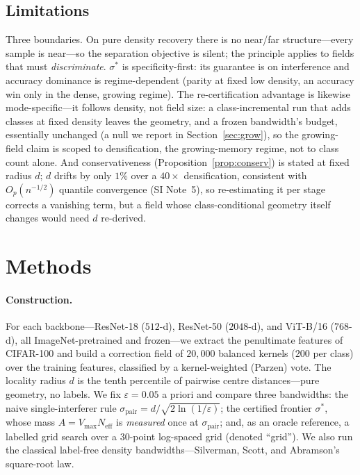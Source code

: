 \documentclass[10pt,twocolumn]{article}
\newcommand{\sstar}{\sigma^{*}}
\newcommand{\Neff}{N_{\mathrm{eff}}}
\begin{document}
\subsection{Limitations}\label{sec:limits}
Three boundaries. On pure density recovery there is no near/far structure---every sample is near---so the separation objective is silent; the principle applies to fields that must \emph{discriminate}. $\sstar$ is specificity-first: its guarantee is on interference and accuracy dominance is regime-dependent (parity at fixed low density, an accuracy win only in the dense, growing regime). The re-certification advantage is likewise mode-specific---it follows density, not field size: a class-incremental run that adds classes at fixed density leaves the geometry, and a frozen bandwidth's budget, essentially unchanged (a null we report in Section~\ref{sec:grow}), so the growing-field claim is scoped to densification, the growing-memory regime, not to class count alone. And conservativeness (Proposition~\ref{prop:conserv}) is stated at fixed radius $d$; $d$ drifts by only $1\%$ over a $40\times$ densification, consistent with $O_p(n^{-1/2})$ quantile convergence (SI Note~5), so re-estimating it per stage corrects a vanishing term, but a field whose class-conditional geometry itself changes would need $d$ re-derived.


\section{Methods}
\paragraph{Construction.} For each backbone---ResNet-18 ($512$-d), ResNet-50 ($2048$-d), and ViT-B/16 ($768$-d), all ImageNet-pretrained and frozen---we extract the penultimate features of CIFAR-100 and build a correction field of $20{,}000$ balanced kernels ($200$ per class) over the training features, classified by a kernel-weighted (Parzen) vote. The locality radius $d$ is the tenth percentile of pairwise centre distances---pure geometry, no labels. We fix $\varepsilon=0.05$ a priori and compare three bandwidths: the naive single-interferer rule $\sigma_{\mathrm{pair}}=d/\sqrt{2\ln(1/\varepsilon)}$; the certified frontier $\sstar$, whose mass $A=V_{\max}\Neff$ is \emph{measured} once at $\sigma_{\mathrm{pair}}$; and, as an oracle reference, a labelled grid search over a $30$-point log-spaced grid (denoted ``grid''). We also run the classical label-free density bandwidths---Silverman, Scott, and Abramson's square-root law.
\end{document}
